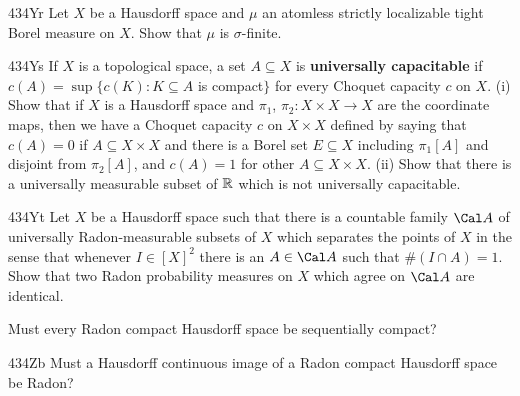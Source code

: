 {\spheader 434Yr Let $X$ be a Hausdorff space and $\mu$ an atomless strictly
localizable tight Borel measure on $X$.  
Show that $\mu$ is $\sigma$-finite.

\spheader 434Ys
If $X$ is a topological space, a set $A\subseteq X$ is 
{\bf universally capacitable} if 
$c(A)=\sup\{c(K):K\subseteq A$ is compact$\}$ for every Choquet capacity 
$c$ on $X$.   (i) Show that if $X$ is a Hausdorff space and $\pi_1$,
$\pi_2:X\times X\to X$ are the coordinate maps, then we have a 
Choquet capacity $c$
on $X\times X$ defined by saying that $c(A)=0$ if $A\subseteq X\times X$
and there is a Borel set $E\subseteq X$ including $\pi_1[A]$ and disjoint
from $\pi_2[A]$, and $c(A)=1$ for other $A\subseteq X\times X$.
(ii) Show that there is a universally measurable subset of $\Bbb R$ which
is not universally capacitable.   

\spheader 434Yt
Let $X$ be a Hausdorff space such that there is a countable family 
$\Cal A$ of universally Radon-measurable subsets of $X$ which separates the
points of $X$ in the sense that whenever $I\in[X]^2$ there is an 
$A\in\Cal A$ such that $\#(I\cap A)=1$.   Show that two
Radon probability measures on $X$ which agree on $\Cal A$ are identical.
}%

 Must every Radon compact Hausdorff space be
sequentially compact?

\spheader 434Zb Must a Hausdorff continuous image of a Radon compact
Hausdorff space be Radon?

